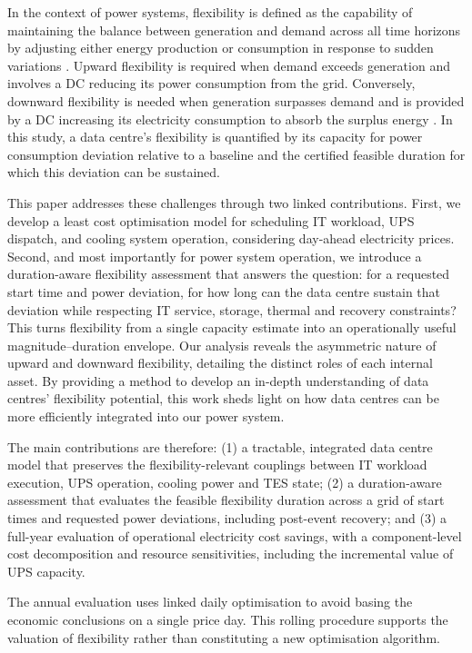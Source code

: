 \documentclass[lettersize,journal]{IEEEtran}
\newcommand{\rev}[1]{#1}
\begin{document}
In the context of power systems, flexibility is defined as the capability of maintaining the balance between generation and demand across all time horizons by adjusting either energy production or consumption in response to sudden variations \cite{Centrica2020LEM, EEAACER2023Flex, neso2025future, Nosair2015TSTE}. Upward flexibility is required when demand exceeds generation and involves a DC reducing its power consumption from the grid. Conversely, downward flexibility is needed when generation surpasses demand and is provided by a DC increasing its electricity consumption to absorb the surplus energy \cite{Centrica2020LEM, NG2017SNAPS}. In this study, a data centre's flexibility is quantified by its capacity for power consumption deviation relative to a baseline and the certified feasible duration for which this deviation can be sustained.

\rev{This paper addresses these challenges through two linked contributions. First, we develop a least cost optimisation model for scheduling IT workload, UPS dispatch, and cooling system operation, considering day-ahead electricity prices. Second, and most importantly for power system operation, we introduce a duration-aware flexibility assessment that answers the question: for a requested start time and power deviation, for how long can the data centre sustain that deviation while respecting IT service, storage, thermal and recovery constraints? This turns flexibility from a single capacity estimate into an operationally useful magnitude--duration envelope.} Our analysis reveals the asymmetric nature of upward and downward flexibility, detailing the distinct roles of each internal asset. By providing a method to develop an in-depth understanding of data centres' flexibility potential, this work sheds light on how data centres can be more efficiently integrated into our power system.

\rev{The main contributions are therefore: (1) a tractable, integrated data centre model that preserves the flexibility-relevant couplings between IT workload execution, UPS operation, cooling power and TES state; (2) a duration-aware assessment that evaluates the feasible flexibility duration across a grid of start times and requested power deviations, including post-event recovery; and (3) a full-year evaluation of operational electricity cost savings, with a component-level cost decomposition and resource sensitivities, including the incremental value of UPS capacity.}

The annual evaluation uses linked daily optimisation to avoid basing the economic conclusions on a single price day. This rolling procedure supports the valuation of flexibility rather than constituting a new optimisation algorithm.
\end{document}
